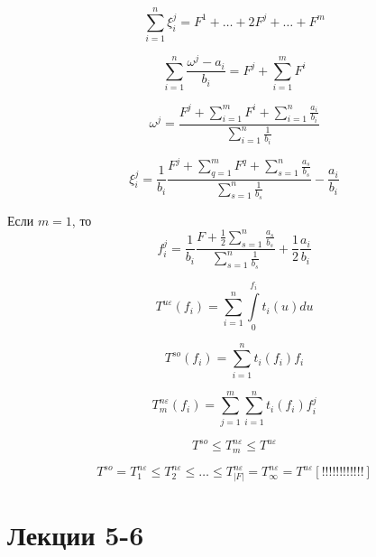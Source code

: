 \documentclass[12pt,a4paper,titlepage,oneside]{book}
\theoremstyle{definition}
\theoremstyle{plain}
\theoremstyle{remark}
\theoremstyle{remark}
\theoremstyle{plain}
\theoremstyle{plain}
\begin{document}
\begin{equation*}
\sum\limits_{i=1}^n\xi_i^j = F^1 + \dots + 2F^j+ \dots + F^m
\end{equation*}

\begin{equation*}
\sum\limits_{i=1}^n\frac{\omega^j - a_i}{b_i} = F^j + \sum\limits_{i=1}^m F^i
\end{equation*}

\begin{equation*}
\omega^j = \frac{F^j + \sum\limits_{i=1}^m F^i + \sum\limits_{i=1}^n  \frac{a_i}{b_i}}{\sum\limits_{i=1}^n \frac{1}{b_i}}
\end{equation*}

\begin{equation*}
\xi_i^j = \frac{1}{b_i}\frac{F^j + \sum\limits_{q=1}^m F^q + \sum\limits_{s=1}^n \frac{a_s}{b_s}}{\sum\limits_{s=1}^n \frac{1}{b_s}} - \frac{a_i}{b_i}
\end{equation*}

Если $m=1$, то
\begin{equation*}
f_i^j = \frac{1}{b_i}\frac{F+ \frac{1}{2}\sum\limits_{s=1}^n \frac{a_s}{b_s}}{\sum\limits_{s=1}^n\frac{1}{b_s}} + \frac{1}{2}\frac{a_i}{b_i}
\end{equation*}

\begin{equation*}
T^{u \varepsilon}(f_i) = \sum\limits_{i=1}^n \int\limits_0^{f_i} t_i(u)du
\end{equation*}

\begin{equation*}
T^{so}(f_i) = \sum\limits_{i=1}^n t_i(f_i)f_i
\end{equation*}


\begin{equation*}
T_m^{n \varepsilon}(f_i) = \sum\limits_{j=1}^m \sum\limits_{i=1}^n t_i(f_i)f_i^j
\end{equation*}

\begin{equation*}
T^{so} \leq T_m^{n \varepsilon} \leq T^{u \varepsilon}
\end{equation*}

\begin{equation*}
T^{so} = T_1^{n \varepsilon} \leq T_2^{n \varepsilon} \leq \dots \leq T_{|F|}^{n \varepsilon} 
= T_{\infty}^{n \varepsilon} = T^{u \varepsilon} [!!!!!!!!!!!!]
\end{equation*}


\chapter{Лекции 5-6}
\end{document}
